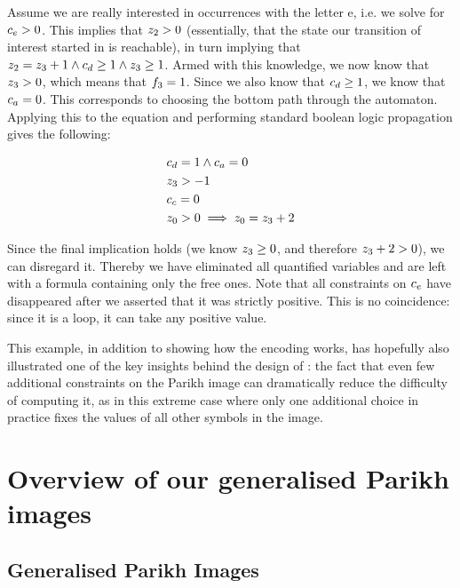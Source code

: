 \documentclass[acmsmall,review,anonymous]{acmart}\settopmatter{printfolios=true,printccs=false,printacmref=true}
\theoremstyle{definition}
\begin{document}
Assume we are really interested in occurrences with the letter e, i.e. we solve
for $c_e > 0$. This implies that $z_{2} > 0$ (essentially, that
the state our transition of interest started in is reachable), in turn implying
that $z_{2} = z_{3} + 1 \land c_{d} \geq 1 \land
z_{3} \geq 1$. Armed with this knowledge, we now know that $z_3
> 0$, which means that $f_3 = 1$. Since we also know that
$c_d \geq 1$, we know that $c_a = 0$. This corresponds to
choosing the bottom path through the automaton. Applying this to the equation
and performing standard boolean logic propagation gives the following:

\begin{equation}
  \begin{aligned}
  &c_{d} = 1 \land c_{a} = 0 \\
  & z_{3} > -1 \\
  &c_{c} = 0\\
  &z_{0} > 0 \implies z_{0} = z_{3} + 2\\
  \end{aligned}
  \label{eq:parikh-formula:choose-a}
  \end{equation}

  Since the final implication holds (we know $z_3 \geq 0$, and therefore
  $z_3 + 2 > 0$), we can disregard it. Thereby we have eliminated all
  quantified variables and are left with a formula containing only the free
  ones. Note that all constraints on $c_e$ have disappeared after we
  asserted that it was strictly positive. This is no coincidence: since it is a
  loop, it can take any positive value.

  This example, in addition to showing how the encoding works, has hopefully
  also illustrated one of the key insights behind the design of \Calculus: the
  fact that even few additional constraints on the Parikh image can dramatically
  reduce the difficulty of computing it, as in this extreme case where only one
  additional choice in practice fixes the values of all other symbols in the image.

\section{Overview of our generalised Parikh images}

\subsection{Generalised Parikh Images}\label{sec:generalised}
\end{document}
